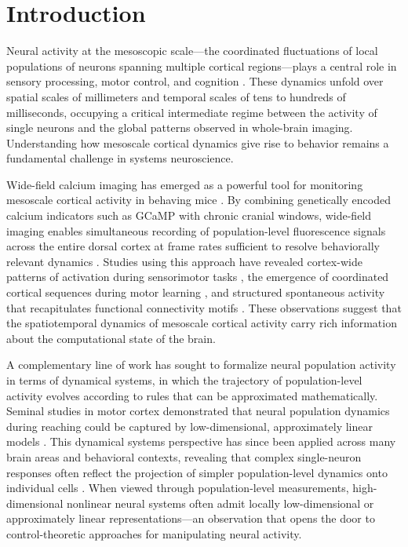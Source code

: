 \documentclass[11pt]{article}
\begin{document}
\section*{Introduction}

Neural activity at the mesoscopic scale---the coordinated fluctuations of local populations of neurons spanning multiple cortical regions---plays a central role in sensory processing, motor control, and cognition \citep{churchland2012neural, musall2019single, stringer2019high}. These dynamics unfold over spatial scales of millimeters and temporal scales of tens to hundreds of milliseconds, occupying a critical intermediate regime between the activity of single neurons and the global patterns observed in whole-brain imaging. Understanding how mesoscale cortical dynamics give rise to behavior remains a fundamental challenge in systems neuroscience.

Wide-field calcium imaging has emerged as a powerful tool for monitoring mesoscale cortical activity in behaving mice \citep{wekselblatt2016large, allen2017global, makino2017transformation}. By combining genetically encoded calcium indicators such as GCaMP with chronic cranial windows, wide-field imaging enables simultaneous recording of population-level fluorescence signals across the entire dorsal cortex at frame rates sufficient to resolve behaviorally relevant dynamics \citep{ren2021characterizing, ghanbari2019cortex}. Studies using this approach have revealed cortex-wide patterns of activation during sensorimotor tasks \citep{musall2019single, pinto2019task}, the emergence of coordinated cortical sequences during motor learning \citep{makino2017transformation}, and structured spontaneous activity that recapitulates functional connectivity motifs \citep{mohajerani2013spontaneous, vanni2014mesoscale}. These observations suggest that the spatiotemporal dynamics of mesoscale cortical activity carry rich information about the computational state of the brain.

A complementary line of work has sought to formalize neural population activity in terms of dynamical systems, in which the trajectory of population-level activity evolves according to rules that can be approximated mathematically. Seminal studies in motor cortex demonstrated that neural population dynamics during reaching could be captured by low-dimensional, approximately linear models \citep{churchland2012neural, cunningham2014dimensionality}. This dynamical systems perspective has since been applied across many brain areas and behavioral contexts, revealing that complex single-neuron responses often reflect the projection of simpler population-level dynamics onto individual cells \citep{vyas2020computation, saxena2019towards}. When viewed through population-level measurements, high-dimensional nonlinear neural systems often admit locally low-dimensional or approximately linear representations---an observation that opens the door to control-theoretic approaches for manipulating neural activity.
\end{document}
